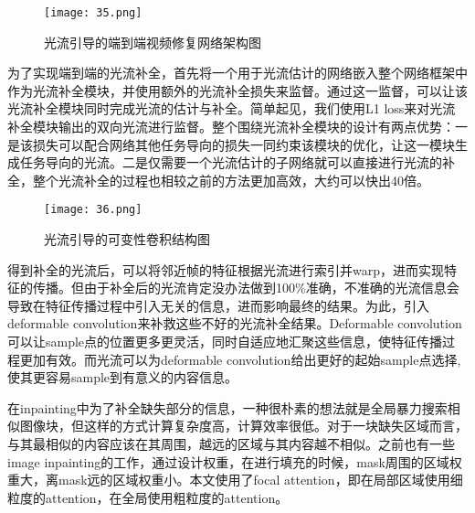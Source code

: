 \begin{figure}[!htbp]
	\centering
	\texttt{[image: 35.png]}
	\caption{光流引导的端到端视频修复网络架构图}
	\label{fig:35}
\end{figure}

为了实现端到端的光流补全，首先将一个用于光流估计的网络嵌入整个网络框架中作为光流补全模块，并使用额外的光流补全损失来监督。通过这一监督，可以让该光流补全模块同时完成光流的估计与补全。简单起见，我们使用L1 loss来对光流补全模块输出的双向光流进行监督。整个围绕光流补全模块的设计有两点优势：一是该损失可以配合网络其他任务导向的损失一同约束该模块的优化，让这一模块生成任务导向的光流。二是仅需要一个光流估计的子网络就可以直接进行光流的补全，整个光流补全的过程也相较之前的方法更加高效，大约可以快出40倍。

\begin{figure}[!htbp]
	\centering
	\texttt{[image: 36.png]}
	\caption{光流引导的可变性卷积结构图}
	\label{fig:35}
\end{figure}

得到补全的光流后，可以将邻近帧的特征根据光流进行索引并warp，进而实现特征的传播。但由于补全后的光流肯定没办法做到100\%准确，不准确的光流信息会导致在特征传播过程中引入无关的信息，进而影响最终的结果。为此，引入deformable convolution来补救这些不好的光流补全结果。Deformable convolution可以让sample点的位置更多更灵活，同时自适应地汇聚这些信息，使特征传播过程更加有效。而光流可以为deformable convolution给出更好的起始sample点选择,使其更容易sample到有意义的内容信息。

在inpainting中为了补全缺失部分的信息，一种很朴素的想法就是全局暴力搜索相似图像块，但这样的方式计算复杂度高，计算效率很低。对于一块缺失区域而言，与其最相似的内容应该在其周围，越远的区域与其内容越不相似。之前也有一些image inpainting的工作，通过设计权重，在进行填充的时候，mask周围的区域权重大，离mask远的区域权重小。本文使用了focal attention，即在局部区域使用细粒度的attention，在全局使用粗粒度的attention。